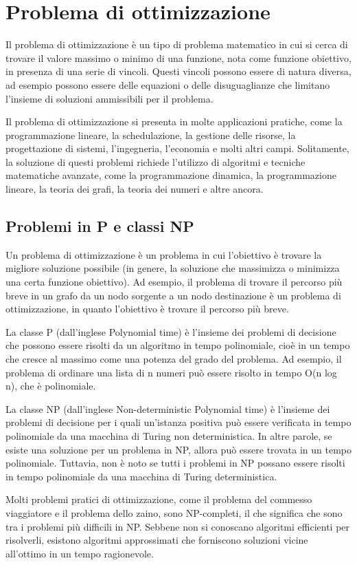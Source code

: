 \chapter{Problema di ottimizzazione}
Il problema di ottimizzazione è un tipo di problema matematico in cui si cerca di trovare il valore massimo o minimo di una funzione, nota come funzione obiettivo, in presenza di una serie di vincoli. Questi vincoli possono essere di natura diversa, ad esempio possono essere delle equazioni o delle disuguaglianze che limitano l'insieme di soluzioni ammissibili per il problema.

Il problema di ottimizzazione si presenta in molte applicazioni pratiche, come la programmazione lineare, la schedulazione, la gestione delle risorse, la progettazione di sistemi, l'ingegneria, l'economia e molti altri campi. Solitamente, la soluzione di questi problemi richiede l'utilizzo di algoritmi e tecniche matematiche avanzate, come la programmazione dinamica, la programmazione lineare, la teoria dei grafi, la teoria dei numeri e altre ancora.

\section{Problemi in P e classi NP}
Un problema di ottimizzazione è un problema in cui l'obiettivo è trovare la migliore soluzione possibile (in genere, la soluzione che massimizza o minimizza una certa funzione obiettivo). Ad esempio, il problema di trovare il percorso più breve in un grafo da un nodo sorgente a un nodo destinazione è un problema di ottimizzazione, in quanto l'obiettivo è trovare il percorso più breve.

La classe P (dall'inglese Polynomial time) è l'insieme dei problemi di decisione che possono essere risolti da un algoritmo in tempo polinomiale, cioè in un tempo che cresce al massimo come una potenza del grado del problema. Ad esempio, il problema di ordinare una lista di n numeri può essere risolto in tempo O(n log n), che è polinomiale.

La classe NP (dall'inglese Non-deterministic Polynomial time) è l'insieme dei problemi di decisione per i quali un'istanza positiva può essere verificata in tempo polinomiale da una macchina di Turing non deterministica. In altre parole, se esiste una soluzione per un problema in NP, allora può essere trovata in un tempo polinomiale. Tuttavia, non è noto se tutti i problemi in NP possano essere risolti in tempo polinomiale da una macchina di Turing deterministica.

Molti problemi pratici di ottimizzazione, come il problema del commesso viaggiatore e il problema dello zaino, sono NP-completi, il che significa che sono tra i problemi più difficili in NP. Sebbene non si conoscano algoritmi efficienti per risolverli, esistono algoritmi approssimati che forniscono soluzioni vicine all'ottimo in un tempo ragionevole.
